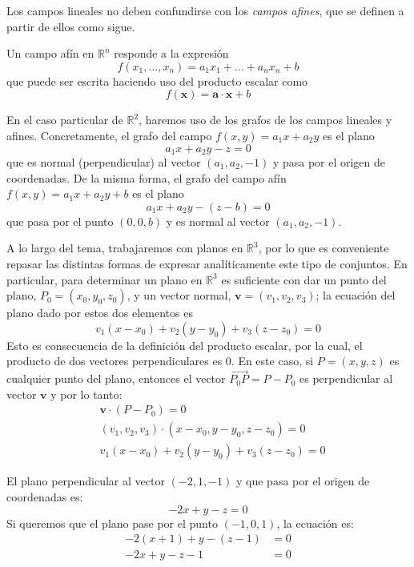 Los campos lineales no deben confundirse con los \emph{campos afines}, que se definen a partir de ellos como sigue.
%
\begin{definicion}
Un campo afín en $\mathbb{R}^n$ responde a la expresión
\[
f(x_1,\dots,x_n) = a_1x_1+\dots+a_nx_n +b
\]
que puede ser escrita haciendo uso del producto escalar como
\[
f(\boldsymbol x) = \boldsymbol a\cdot \boldsymbol x+b
\]
\end{definicion}
%
En el caso particular de $\mathbb{R}^2$, haremos uso de los grafos de los campos lineales y afines.
Concretamente, el grafo del campo $f(x,y)=a_1x+a_2y$ es el plano
\[
a_1x+a_2y-z = 0
\]
que es normal (perpendicular) al vector $(a_1,a_2,-1)$ y pasa por el origen de coordenadas.
De la misma forma, el grafo del campo afín $f(x,y)=a_1x+a_2y+b$ es el plano
\[
a_1x+a_2y-(z-b) = 0
\]
que pasa por el punto $(0,0,b)$ y es normal al vector $(a_1,a_2,-1)$.

A lo largo del tema, trabajaremos con planos en $\mathbb{R}^3$, por lo que es conveniente repasar las distintas formas de expresar analíticamente este tipo de conjuntos.
En particular, para determinar un plano en $\mathbb{R}^3$ es suficiente con dar un punto del plano, $P_0=(x_0,y_0,z_0)$, y un vector normal, $\boldsymbol v=(v_1,v_2,v_3)$; la ecuación del plano dado por estos dos elementos es
\[
v_1(x-x_0)+v_2(y-y_0)+v_3(z-z_0) = 0
\]
Esto es consecuencia de la definición del producto escalar, por la cual, el producto de dos vectores perpendiculares es 0. En este caso, si $P=(x,y,z)$ es cualquier punto del plano, entonces el vector
$\overrightarrow{P_0P}=P-P_0$ es perpendicular al vector $\boldsymbol v$ y por lo tanto:
\begin{align*}
&\boldsymbol v\cdot(P-P_0)=0\\
&(v_1,v_2,v_3)\cdot(x-x_0,y-y_0,z-z_0) = 0\\
&v_1(x-x_0)+v_2(y-y_0)+v_3(z-z_0) = 0
\end{align*}
%
\begin{ejemplo}
El plano perpendicular al vector $(-2,1,-1)$ y que pasa por el origen de coordenadas es:
\[
-2x+y-z=0
\]
Si queremos que el plano pase por el punto $(-1,0,1)$, la ecuación es:
\begin{align*}
-2(x+1)+y-(z-1)&=0\\
-2x+y-z -1 &=0\tag*{\fej}
\end{align*}
\end{ejemplo}




